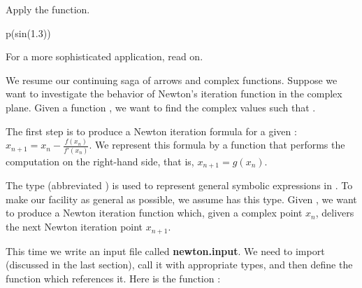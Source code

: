 \begin{xtc}
\begin{xtccomment}
Apply the function.
\end{xtccomment}
\begin{spadsrc}
p(sin(1.3))
\end{spadsrc}
\begin{TeXOutput}
\begin{fricasmath}{3}
%
\end{fricasmath}
\end{TeXOutput}
\end{xtc}

For a more sophisticated application, read on.



We resume
our continuing saga of arrows and complex functions.
Suppose we want to investigate the behavior of Newton's iteration function
in the complex plane.
Given a function , we want to find the complex values
 such that .

The first step is to produce a Newton iteration formula for
a given :
$x_{n+1} = x_n - \frac{f(x_n)}{f'(x_n)}.$
We represent this formula by a function 
that performs the computation on the right-hand side, that is,
$x_{n+1} = {g}(x_n)$.

The type 
(abbreviated )
is used to represent general symbolic expressions in
\Language{}.
To make our facility as general as possible, we assume
 has this type.
Given , we want
to produce a Newton iteration function  which,
given a complex point $x_n$, delivers the next
Newton iteration point $x_{n+1}$.

This time we write an input file called {\bf newton.input}.
We need to import  (discussed
in the last section), call it with appropriate types, and then define
the function  which references it.
Here is the function :

